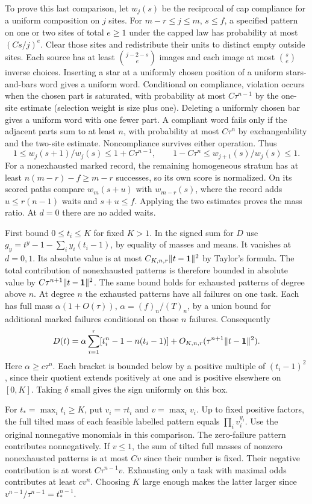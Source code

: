 To prove this last comparison, let $w_j(s)$ be the reciprocal of cap compliance for a uniform composition on $j$ sites. For $m-r\le j\le m$, $s\le f$, a specified pattern on one or two sites of total $e\ge1$ under the capped law has probability at most $(Cs/j)^e$. Clear those sites and redistribute their units to distinct empty outside sites. Each source has at least $\binom{j-2-s}{e}$ images and each image at most $\binom{s}{e}$ inverse choices. Inserting a star at a uniformly chosen position of a uniform stars-and-bars word gives a uniform word. Conditional on compliance, violation occurs when the chosen part is saturated, with probability at most $C\tau^{n-1}$ by the one-site estimate (selection weight is size plus one). Deleting a uniformly chosen bar gives a uniform word with one fewer part. A compliant word fails only if the adjacent parts sum to at least $n$, with probability at most $C\tau^n$ by exchangeability and the two-site estimate. Noncompliance survives either operation. Thus
\[
 1\le w_j(s+1)/w_j(s)\le1+C\tau^{n-1},\qquad
 1-C\tau^n\le w_{j+1}(s)/w_j(s)\le1 .
\]
For a nonexhausted marked record, the remaining homogeneous stratum has at least $n(m-r)-f\ge m-r$ successes, so its own score is normalized. On its scored paths compare $w_m(s+u)$ with $w_{m-r}(s)$, where the record adds $u\le r(n-1)$ waits and $s+u\le f$. Applying the two estimates proves the mass ratio. At $d=0$ there are no added waits.

First bound $0\le t_i\le K$ for fixed $K>1$. In the signed sum for $D$ use $g_y=t^y-1-\sum_i y_i(t_i-1)$, by equality of masses and means. It vanishes at $d=0,1$. Its absolute value is at most $C_{K,n,r}\|t-{\bf1}\|^2$ by Taylor's formula. The total contribution of nonexhausted patterns is therefore bounded in absolute value by $C\tau^{n+1}\|t-{\bf1}\|^2$. The same bound holds for exhausted patterns of degree above $n$. At degree $n$ the exhausted patterns have all failures on one task. Each has full mass $\alpha(1+O(\tau))$, $\alpha=(f)_n/(T)_n$, by a union bound for additional marked failures conditional on those $n$ failures. Consequently
\[
 D(t)=\alpha\sum_{i=1}^r[t_i^n-1-n(t_i-1)]
        +O_{K,n,r}(\tau^{n+1}\|t-{\bf1}\|^2).
\]
Here $\alpha\ge c\tau^n$. Each bracket is bounded below by a positive multiple of $(t_i-1)^2$, since their quotient extends positively at one and is positive elsewhere on $[0,K]$. Taking $\delta$ small gives the sign uniformly on this box.

For $t_*=\max_i t_i\ge K$, put $v_i=\tau t_i$ and $v=\max_i v_i$. Up to fixed positive factors, the full tilted mass of each feasible labelled pattern equals $\prod_i v_i^{y_i}$. Use the original nonnegative monomials in this comparison. The zero-failure pattern contributes nonnegatively. If $v\le1$, the sum of tilted full masses of nonzero nonexhausted patterns is at most $Cv$ since their number is fixed. Their negative contribution is at worst $C\tau^{n-1}v$. Exhausting only a task with maximal odds contributes at least $cv^n$. Choosing $K$ large enough makes the latter larger since $v^{n-1}/\tau^{n-1}=t_*^{n-1}$.

